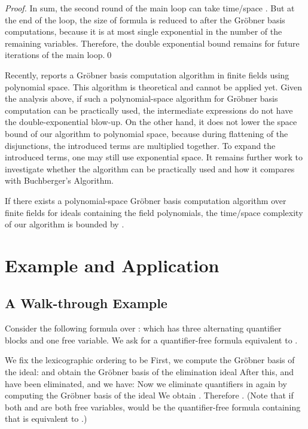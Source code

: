 \documentclass[envcountsect]{llncs}
\begin{document}
{{\begin{proof}
In sum, the second round of the main loop can take time/space . But at the end of the loop, the size of formula is reduced to  after the Gr\"obner basis computations, because it is at most single exponential in the number of the remaining variables. Therefore, the double exponential bound remains for future iterations of the main loop.\qed
\end{proof}

Recently, \cite{pspaceGB} reports a Gr\"obner basis computation algorithm in finite fields using polynomial space. This algorithm is theoretical and cannot be applied yet. Given the analysis above, if such a polynomial-space algorithm for Gr\"obner basis computation can be practically used, the intermediate expressions do not have the double-exponential blow-up. On the other hand, it does not lower the space bound of our algorithm to polynomial space, because during flattening of the disjunctions, the introduced terms are multiplied together. To expand the introduced terms, one may still use exponential space. It remains further work to investigate whether the algorithm can be practically used and how it compares with Buchberger's Algorithm.
\begin{proposition}
If there exists a polynomial-space Gr\"obner basis computation algorithm over finite fields for ideals containing the field polynomials, the time/space complexity of our algorithm is bounded by .
 \label{pspace}
\end{proposition}

\section{Example and Application}

\subsection{A Walk-through Example}

Consider the following formula over :  which has three alternating quantifier blocks and one free variable. We ask for a quantifier-free formula  equivalent to . 

We fix the lexicographic ordering to be  First, we compute the Gr\"obner basis  of the ideal: {}and obtain the Gr\"obner basis of the elimination ideal { }After this,  and  have been eliminated, and we have:
 {}Now we eliminate quantifiers in  again by computing the Gr\"obner basis  of the ideal {} We obtain . Therefore 
{.} (Note that if both  and  are both free variables,  would be the quantifier-free formula containing  that is equivalent to .) 

}}
\end{document}
